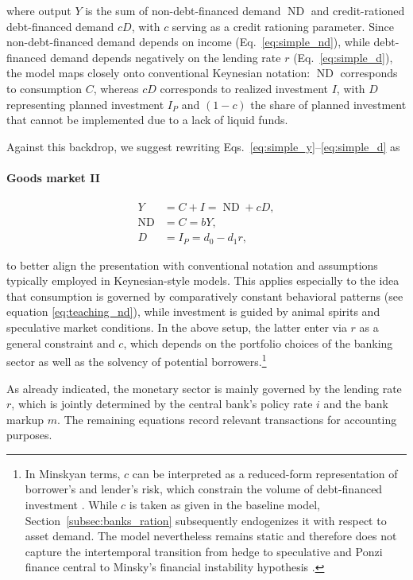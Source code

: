 \documentclass[12pt,a4paper]{article}
\DeclareMathOperator{\ND}{ND}
\begin{document}
where output $Y$ is the sum of non-debt-financed demand $\ND$ and credit-rationed debt-financed demand $cD$, with $c$ serving as a credit rationing parameter.
Since non-debt-financed demand depends on income (Eq.~\ref{eq:simple_nd}), while debt-financed demand depends negatively on the lending rate $r$ (Eq.~\ref{eq:simple_d}), the model maps closely onto conventional Keynesian notation: $\ND$ corresponds to consumption $C$, whereas $cD$ corresponds to realized investment $I$, with $D$ representing planned investment $I_P$ and $(1-c)$ the share of planned investment that cannot be implemented due to a lack of liquid funds.

Against this backdrop, we suggest rewriting Eqs.~\ref{eq:simple_y}--\ref{eq:simple_d} as

\paragraph{Goods market II}
\begin{align}
  Y &= C + I = \ND + cD \label{eq:teaching_y}, \\
  \ND &= C = b Y \label{eq:teaching_nd}, \\
  D &= I_P = d_0 - d_1 r \label{eq:teaching_d},
\end{align}

to better align the presentation with conventional notation and assumptions typically employed in Keynesian-style models.
This applies especially to the idea that consumption is governed by comparatively constant behavioral patterns (see equation \ref{eq:teaching_nd}), while investment is guided by animal spirits and speculative market conditions.
In the above setup, the latter enter via $r$ as a general constraint and $c$, which depends on the portfolio choices of the banking sector as well as the solvency of potential borrowers.\footnote{In Minskyan terms, $c$ can be interpreted as a reduced-form representation of borrower's and lender's risk, which constrain the volume of debt-financed investment \parencite[Ch.~8]{minskyStabilizingUnstableEconomy1986}. While $c$ is taken as given in the baseline model, Section~\ref{subsec:banks_ration} subsequently endogenizes it with respect to asset demand. The model nevertheless remains static and therefore does not capture the intertemporal transition from hedge to speculative and Ponzi finance central to Minsky's financial instability hypothesis \parencite{minskyFinancialInstabilityHypothesis1992}.}

As already indicated, the monetary sector is mainly governed by the lending rate $r$, which is jointly determined by the central bank's policy rate $i$ and the bank markup $m$. The remaining equations record relevant transactions for accounting purposes.
\end{document}
